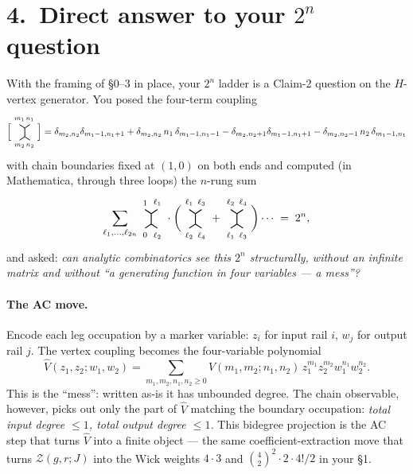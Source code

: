 \documentclass[11pt,a4paper]{article}
\newcommand{\Hvert}[4]{%
\begin{tikzpicture}[baseline=-0.5ex,scale=0.65]
  \draw[thick] (-0.3,0.45) node[above]{\scriptsize $#1$} -- (0,0.25);
  \draw[thick] (0.3,0.45) node[above]{\scriptsize $#2$} -- (0,0.25);
  \draw[thick] (0,0.25)--(0,-0.25);
  \draw[thick] (-0.3,-0.45) node[below]{\scriptsize $#3$} -- (0,-0.25);
  \draw[thick] (0.3,-0.45) node[below]{\scriptsize $#4$} -- (0,-0.25);
\end{tikzpicture}}
\begin{document}
\section*{4.\ Direct answer to your $2^n$ question}

With the framing of \S 0--3 in place, your $2^n$ ladder is a Claim-2 question
on the $H$-vertex generator.  You posed the four-term coupling
\[
\Big[\Hvert{m_1}{n_1}{m_2}{n_2}\Big]
= \delta_{m_2,n_2}\delta_{m_1{-}1,n_1{+}1}
+ \delta_{m_2,n_2}\,n_1\,\delta_{m_1{-}1,n_1{-}1}
- \delta_{m_2,n_2{+}1}\delta_{m_1{-}1,n_1{+}1}
- \delta_{m_2,n_2{-}1}\,n_2\,\delta_{m_1{-}1,n_1}
\]
with chain boundaries fixed at $(1,0)$ on both ends and computed (in
Mathematica, through three loops) the $n$-rung sum
\[
\sum_{\ell_1,\dots,\ell_{2n}}
\Hvert{1}{\ell_1}{0}{\ell_2}\cdot
\bigg(\Hvert{\ell_1}{\ell_3}{\ell_2}{\ell_4}+\Hvert{\ell_2}{\ell_4}{\ell_1}{\ell_3}\bigg)\cdots
\;=\; 2^n,
\]
and asked: \emph{can analytic combinatorics see this $2^n$ structurally,
without an infinite matrix and without ``a generating function in four
variables --- a mess''?}

\paragraph{The AC move.}
Encode each leg occupation by a marker variable: $z_i$ for input rail $i$,
$w_j$ for output rail $j$.  The vertex coupling becomes the four-variable
polynomial
\[
\widehat V(z_1,z_2;w_1,w_2)
= \sum_{m_1,m_2,n_1,n_2 \ge 0} V(m_1,m_2;n_1,n_2)\,z_1^{m_1}z_2^{m_2}w_1^{n_1}w_2^{n_2}.
\]
This is the ``mess'': written as-is it has unbounded degree.  The chain
observable, however, picks out only the part of $\widehat V$ matching the
boundary occupation: \emph{total input degree $\le 1$, total output degree
$\le 1$.}  This bidegree projection is the AC step that turns $\widehat V$
into a finite object --- the same coefficient-extraction move that turns
$\mathcal{Z}(g,r;J)$ into the Wick weights $4\cdot 3$ and
$\binom{4}{2}^2\!\cdot 2\cdot 4!/2$ in your \S 1.
\end{document}
